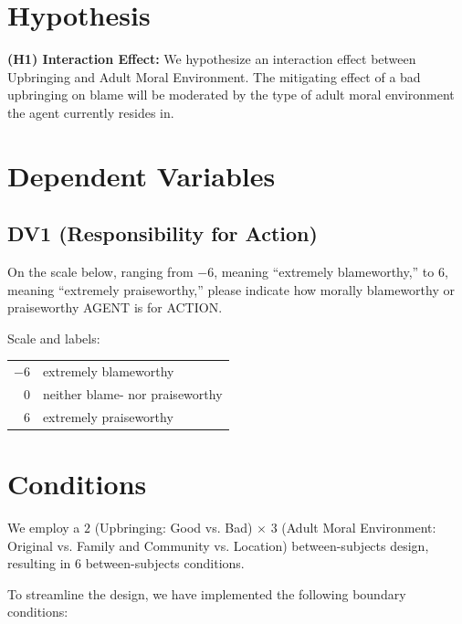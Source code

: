 \documentclass[scrarticle]{scrartcl}
\begin{document}
\section{Hypothesis}
\textsf{\textbf{(H1) Interaction Effect:}}
We hypothesize an interaction effect between Upbringing and Adult Moral Environment.
The mitigating effect of a bad upbringing on blame will be moderated by the type of adult moral environment the agent currently resides in.


\section{Dependent Variables}


\subsection*{DV1 (Responsibility for Action)}
On the scale below, ranging from $-6$, meaning \enquote{extremely blameworthy,} to $6$, meaning \enquote{extremely praiseworthy,} please indicate how morally blameworthy or praiseworthy AGENT is for ACTION.

\vspace{0.75em}
\noindent Scale and labels:

\vspace{0.75em}
\begin{tabular}{r @{ = } l}
   $-6$   & extremely blameworthy             \\
    $0$   & neither blame- nor praiseworthy   \\
    $6$   & extremely praiseworthy            \\
\end{tabular}


\section{Conditions}
We employ a $2$ (Upbringing: Good vs. Bad) $\times$ 3 (Adult Moral Environment: Original vs. Family and Community vs. Location) between-subjects design, resulting in $6$ between-subjects conditions.

To streamline the design, we have implemented the following boundary conditions:
\end{document}
